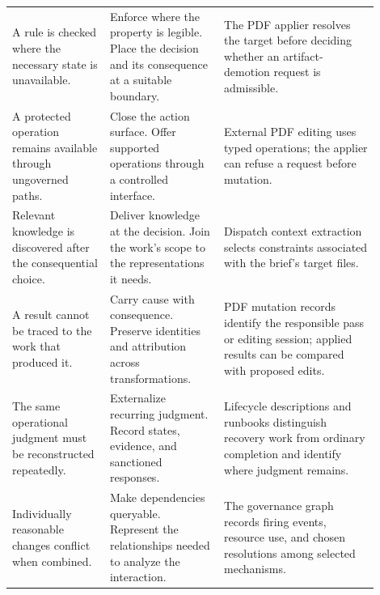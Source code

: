 {\begin{longtable}{@{}p{0.24\linewidth}p{0.28\linewidth}p{0.38\linewidth}@{}}
A rule is checked where the necessary state is unavailable. & Enforce where the property is legible. Place the decision and its consequence at a suitable boundary. & The PDF applier resolves the target before deciding whether an artifact-demotion request is admissible. \\
A protected operation remains available through ungoverned paths. & Close the action surface. Offer supported operations through a controlled interface. & External PDF editing uses typed operations; the applier can refuse a request before mutation. \\
Relevant knowledge is discovered after the consequential choice. & Deliver knowledge at the decision. Join the work's scope to the representations it needs. & Dispatch context extraction selects constraints associated with the brief's target files. \\
A result cannot be traced to the work that produced it. & Carry cause with consequence. Preserve identities and attribution across transformations. & PDF mutation records identify the responsible pass or editing session; applied results can be compared with proposed edits. \\
The same operational judgment must be reconstructed repeatedly. & Externalize recurring judgment. Record states, evidence, and sanctioned responses. & Lifecycle descriptions and runbooks distinguish recovery work from ordinary completion and identify where judgment remains. \\
Individually reasonable changes conflict when combined. & Make dependencies queryable. Represent the relationships needed to analyze the interaction. & The governance graph records firing events, resource use, and chosen resolutions among selected mechanisms. \\
\bottomrule
\end{longtable}
}

